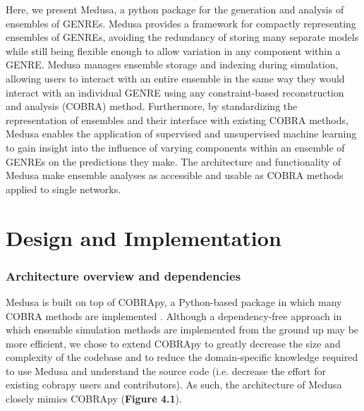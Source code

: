 \documentclass[11pt,twocolumn,notitlepage,openany,twoside]{book}
\begin{document}
\begin{refsection}
Here, we present Medusa, a python package for the generation and analysis of ensembles of GENREs. Medusa provides a framework for compactly representing ensembles of GENREs, avoiding the redundancy of storing many separate models while still being flexible enough to allow variation in any component within a GENRE. Medusa manages ensemble storage and indexing during simulation, allowing users to interact with an entire ensemble in the same way they would interact with an individual GENRE using any constraint-based reconstruction and analysis (COBRA) method. Furthermore, by standardizing the representation of ensembles and their interface with existing COBRA methods, Medusa enables the application of supervised and unsupervised machine learning to gain insight into the influence of varying components within an ensemble of GENREs on the predictions they make. The architecture and functionality of Medusa make ensemble analyses as accessible and usable as COBRA methods applied to single networks.


\section{Design and Implementation}
\subsubsection{Architecture overview and dependencies}

Medusa is built on top of COBRApy, a Python-based package in which many COBRA methods are implemented \cite{Ebrahim2013-eb}. Although a dependency-free approach in which ensemble simulation methods are implemented from the ground up may be more efficient, we chose to extend COBRApy to greatly decrease the size and complexity of the codebase and to reduce the domain-specific knowledge required to use Medusa and understand the source code (i.e. decrease the effort for existing cobrapy users and contributors). As such, the architecture of Medusa closely mimics COBRApy (\textbf{Figure 4.1}).


\end{refsection}
\end{document}
